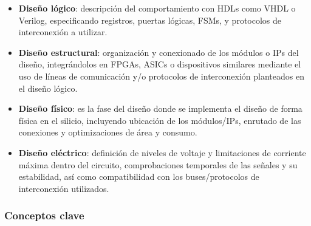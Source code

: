 \begin{itemize}
    \item \textbf{Diseño lógico}: descripción del comportamiento con HDLs como VHDL o Verilog, especificando registros, puertas lógicas, \ac{FSM}s, y protocolos de interconexión a utilizar.
    
    \item \textbf{Diseño estructural}: organización y conexionado de los módulos o IPs del diseño, integrándolos en FPGAs, ASICs o dispositivos similares mediante el uso de líneas de comunicación y/o protocolos de interconexión planteados en el diseño lógico.
    
    \item \textbf{Diseño físico}: es la fase del diseño donde se implementa el diseño de forma física en el silicio, incluyendo ubicación de los módulos/IPs, enrutado de las conexiones y optimizaciones de área y consumo.
    
    \item \textbf{Diseño eléctrico}: definición de niveles de voltaje y limitaciones de corriente máxima dentro del circuito, comprobaciones temporales de las señales y su estabilidad, así como compatibilidad con los buses/protocolos de interconexión utilizados.
\end{itemize}

\subsubsection{Conceptos clave}


